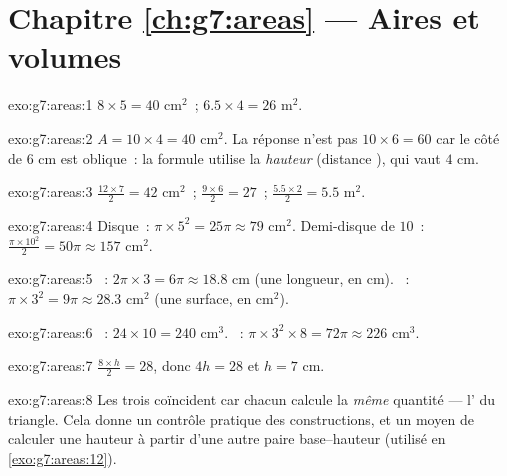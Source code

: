\section*{Chapitre \ref{ch:g7:areas} --- Aires et volumes}

\begin{solution}{exo:g7:areas:1}
$8 \times 5 = 40$ cm$^2$~; \qquad $6.5 \times 4 = 26$ m$^2$.
\end{solution}

\begin{solution}{exo:g7:areas:2}
$A = 10 \times 4 = 40$ cm$^2$. La réponse n'est pas
$10 \times 6 = 60$ car le côté de $6$ cm est oblique~: la formule
utilise la \emph{hauteur} (distance ), qui vaut $4$ cm.
\end{solution}

\begin{solution}{exo:g7:areas:3}
$\frac{12 \times 7}{2} = 42$ cm$^2$~; \quad
$\frac{9 \times 6}{2} = 27$~; \quad
$\frac{5.5 \times 2}{2} = 5.5$ m$^2$.
\end{solution}

\begin{solution}{exo:g7:areas:4}
Disque~: $\pi \times 5^2 = 25\pi \approx 79$ cm$^2$. Demi-disque de
 $10$~: $\frac{\pi \times 10^2}{2} = 50\pi \approx 157$ cm$^2$.
\end{solution}

\begin{solution}{exo:g7:areas:5}
~: $2\pi \times 3 = 6\pi \approx 18.8$ cm (une longueur, en
cm). ~: $\pi \times 3^2 = 9\pi \approx 28.3$ cm$^2$ (une surface,
en cm$^2$).
\end{solution}

\begin{solution}{exo:g7:areas:6}
~: $24 \times 10 = 240$ cm$^3$. ~:
$\pi \times 3^2 \times 8 = 72\pi \approx 226$ cm$^3$.
\end{solution}

\begin{solution}{exo:g7:areas:7}
$\frac{8 \times h}{2} = 28$, donc $4h = 28$ et $h = 7$ cm.
\end{solution}

\begin{solution}{exo:g7:areas:8}
Les trois  coïncident car chacun calcule la \emph{même}
quantité --- l' du triangle. Cela donne un contrôle pratique des
constructions, et un moyen de calculer une hauteur à partir d'une
autre paire base--hauteur (utilisé en \cref{exo:g7:areas:12}).
\end{solution}

